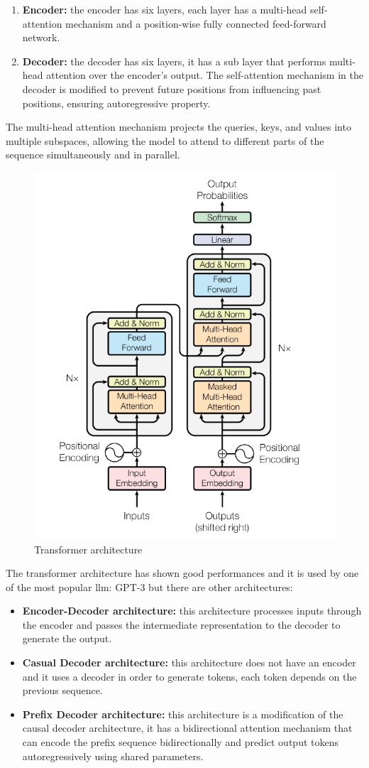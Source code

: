 \begin{enumerate}
    \item \textbf{Encoder:} the encoder has six layers, each layer has a multi-head self-attention mechanism and a position-wise fully connected feed-forward network.

    \item \textbf{Decoder:} the decoder has six layers, it has a sub layer that performs multi-head attention over the encoder’s output. The self-attention mechanism in the decoder is modified to prevent future positions from influencing past positions, ensuring autoregressive property.
\end{enumerate}
The multi-head attention mechanism projects the queries, keys, and values into multiple subspaces, allowing the model to attend to different parts of the sequence simultaneously and in parallel.
\begin{figure}[H]
    \centering
    \includegraphics[width=0.5\linewidth]{Figures/fig_17.png}
    \caption{Transformer architecture}
    \label{fig:enter-label}
\end{figure}
The transformer architecture has shown good performances and it is used by one of the most popular llm: GPT-3 \cite{gpt_dugas} but there are other architectures\cite{naveed2023comprehensive}:
\begin{itemize}
    \item \textbf{Encoder-Decoder architecture:} this architecture processes inputs through the encoder and passes the intermediate representation to the decoder to generate the output.\cite{encoder_medium}

    \item \textbf{Casual Decoder architecture:} this architecture does not have an encoder and it uses a decoder in order to generate tokens, each token depends on the previous sequence. \cite{uniteai_decoder}

    \item \textbf{Prefix Decoder architecture:} this architecture is a modification of the causal decoder architecture, it has a bidirectional attention mechanism that can encode the prefix sequence bidirectionally and predict output tokens autoregressively using shared parameters. \cite{llm_labeller}
\end{itemize}
